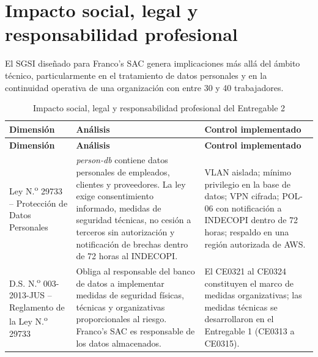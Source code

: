 \documentclass[11pt, a4paper, oneside]{report}
\begin{document}
\normalsize

\section{Impacto social, legal y responsabilidad profesional}

El SGSI diseñado para Franco's SAC genera implicaciones más allá del ámbito técnico, particularmente en el tratamiento de datos personales y en la continuidad operativa de una organización con entre 30 y 40 trabajadores.

\renewcommand{\arraystretch}{1.3}
\footnotesize
{}

\begin{xltabular}{\textwidth}{@{}|L{3.8cm}|X|L{4cm}|@{}}
\caption{Impacto social, legal y responsabilidad profesional del Entregable 2}
\label{tab:impacto_social_legal_e2} \\

\parbox[c][1.1cm][c]{\linewidth}{\centering\color{white}\bfseries\small Dimensión} &
\parbox[c][1.1cm][c]{\linewidth}{\centering\color{white}\bfseries\small Análisis} &
\parbox[c][1.1cm][c]{\linewidth}{\centering\color{white}\bfseries\small Control implementado} \\ \hline
\endfirsthead

\parbox[c][1.1cm][c]{\linewidth}{\centering\color{white}\bfseries\small Dimensión} &
\parbox[c][1.1cm][c]{\linewidth}{\centering\color{white}\bfseries\small Análisis} &
\parbox[c][1.1cm][c]{\linewidth}{\centering\color{white}\bfseries\small Control implementado} \\ \hline
\endhead

\hline
\endfoot

{\small Ley N.\textsuperscript{o} 29733 -- Protección de Datos Personales} & {\small \textit{person-db} contiene datos personales de empleados, clientes y proveedores. La ley exige consentimiento informado, medidas de seguridad técnicas, no cesión a terceros sin autorización y notificación de brechas dentro de 72 horas al INDECOPI.} & {\small VLAN aislada; mínimo privilegio en la base de datos; VPN cifrada; POL-06 con notificación a INDECOPI dentro de 72 horas; respaldo en una región autorizada de AWS.} \\ \hline

{\small D.S. N.\textsuperscript{o} 003-2013-JUS -- Reglamento de la Ley N.\textsuperscript{o} 29733} & {\small Obliga al responsable del banco de datos a implementar medidas de seguridad físicas, técnicas y organizativas proporcionales al riesgo. Franco's SAC es responsable de los datos almacenados.} & {\small El CE0321 al CE0324 constituyen el marco de medidas organizativas; las medidas técnicas se desarrollaron en el Entregable 1 (CE0313 a CE0315).} \\ \hline


\end{xltabular}
\end{document}
